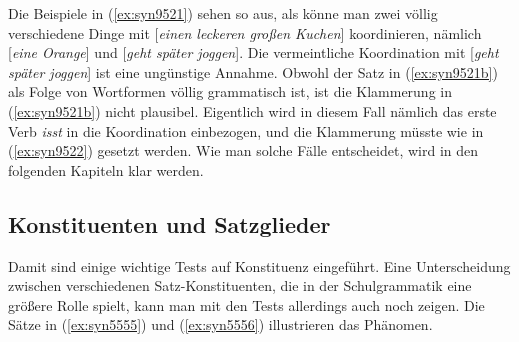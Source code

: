 \begin{exe}
  \begin{xlist}
  \end{xlist}
\end{exe}

Die Beispiele in (\ref{ex:syn9521}) sehen so aus, als könne man zwei völlig verschiedene Dinge mit [\textit{einen leckeren großen Kuchen}] koordinieren, nämlich [\textit{eine Orange}] und [\textit{geht später joggen}].
Die vermeintliche Koordination mit [\textit{geht später joggen}] ist eine ungünstige Annahme.
Obwohl der Satz in (\ref{ex:syn9521b}) als Folge von Wortformen völlig grammatisch ist, ist die Klammerung in (\ref{ex:syn9521b}) nicht plausibel.
Eigentlich wird in diesem Fall nämlich das erste Verb \textit{isst} in die Koordination einbezogen, und die Klammerung müsste wie in (\ref{ex:syn9522}) gesetzt werden.
Wie man solche Fälle entscheidet, wird in den folgenden Kapiteln klar werden.

\begin{exe}
\end{exe}

\subsection{Konstituenten und Satzglieder}

\label{sec:satzglied}

Damit sind einige wichtige Tests auf Konstituenz eingeführt.
Eine Unterscheidung zwischen verschiedenen Satz-Konstituenten, die in der Schulgrammatik eine größere Rolle spielt, kann man mit den Tests allerdings auch noch zeigen.
Die Sätze in (\ref{ex:syn5555}) und (\ref{ex:syn5556}) illustrieren das Phänomen.

\begin{sloppypar}
\begin{exe}
  \ex\label{ex:syn5555}
  \begin{xlist}
  \end{xlist}
  \ex\label{ex:syn5556}
  \begin{xlist}
  \end{xlist}
\end{exe}
\end{sloppypar}

